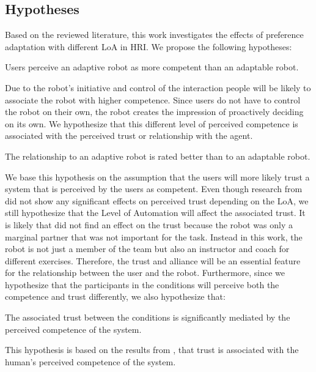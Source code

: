 \subsection{Hypotheses}
Based on the reviewed literature, this work investigates the effects of preference adaptation with different LoA in HRI. We propose the following hypotheses:

\begin{hypo}\label{hyp:adaptability:competence}
 Users perceive an adaptive robot as more competent than an adaptable robot.
\end{hypo}

Due to the robot's initiative and control of the interaction people will be likely to associate the robot with higher competence. Since users do not have to control the robot on their own, the robot creates the impression of proactively deciding on its own. We hypothesize that this different level of perceived competence is associated with the perceived trust or relationship with the agent.

\begin{hypo}\label{hyp:adaptability:trust}
 The relationship to an adaptive robot is rated better than to an adaptable robot.
\end{hypo}

We base this hypothesis on the assumption that the users will more likely trust a system that is perceived by the users as competent. Even though research from \textcite{rau2013effects} did not show any significant effects on perceived trust depending on the LoA, we still hypothesize that the Level of Automation will affect the associated trust. 
It is likely that \textcite{rau2013effects} did not find an effect on the trust because the robot was only a marginal partner that was not important for the task. Instead in this work, the robot is not just a member of the team but also an instructor and coach for different exercises. Therefore, the trust and alliance will be an essential feature for the relationship between the user and the robot.
Furthermore, since we hypothesize that the participants in the conditions will perceive both the competence and trust differently, we also hypothesize that:
\begin{hypo}\label{hyp:adaptability:mediation}
 The associated trust between the conditions is significantly mediated by the perceived competence of the system.
\end{hypo}

This hypothesis is based on the results from \textcite{hancock2011meta}, that trust is associated with the human's perceived competence of the system.

